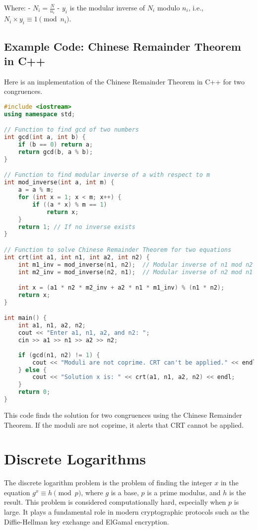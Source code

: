 \documentclass[10pt,a4paper]{article}
\begin{document}
Where:
- \(N_i = \frac{N}{n_i}\)
- \(y_i\) is the modular inverse of \(N_i\) modulo \(n_i\), i.e., \(N_i \times y_i \equiv 1 \pmod{n_i}\).


\subsection*{Example Code: Chinese Remainder Theorem in C++}

Here is an implementation of the Chinese Remainder Theorem in C++ for two congruences.

\begin{lstlisting}[language=C++]
#include <iostream>
using namespace std;

// Function to find gcd of two numbers
int gcd(int a, int b) {
    if (b == 0) return a;
    return gcd(b, a % b);
}

// Function to find modular inverse of a with respect to m
int mod_inverse(int a, int m) {
    a = a % m;
    for (int x = 1; x < m; x++) {
        if ((a * x) % m == 1)
            return x;
    }
    return 1; // If no inverse exists
}

// Function to solve Chinese Remainder Theorem for two equations
int crt(int a1, int n1, int a2, int n2) {
    int m1_inv = mod_inverse(n1, n2);  // Modular inverse of n1 mod n2
    int m2_inv = mod_inverse(n2, n1);  // Modular inverse of n2 mod n1

    int x = (a1 * n2 * m2_inv + a2 * n1 * m1_inv) % (n1 * n2);
    return x;
}

int main() {
    int a1, n1, a2, n2;
    cout << "Enter a1, n1, a2, and n2: ";
    cin >> a1 >> n1 >> a2 >> n2;
    
    if (gcd(n1, n2) != 1) {
        cout << "Moduli are not coprime. CRT can't be applied." << endl;
    } else {
        cout << "Solution x is: " << crt(a1, n1, a2, n2) << endl;
    }
    return 0;
}
\end{lstlisting}

This code finds the solution for two congruences using the Chinese Remainder Theorem. If the moduli are not coprime, it alerts that CRT cannot be applied.


\section*{Discrete Logarithms}

The discrete logarithm problem is the problem of finding the integer \(x\) in the equation \(g^x \equiv h \pmod{p}\), where \(g\) is a base, \(p\) is a prime modulus, and \(h\) is the result. This problem is considered computationally hard, especially when \(p\) is large. It plays a fundamental role in modern cryptographic protocols such as the Diffie-Hellman key exchange and ElGamal encryption.
\end{document}
